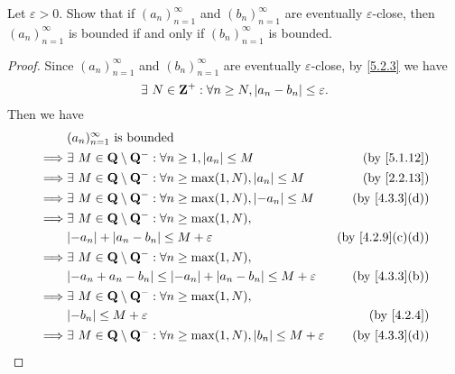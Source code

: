 \begin{exercise}\label{ex 5.2.2}
  Let \(\varepsilon > 0\).
  Show that if \((a_n)_{n = 1}^{\infty}\) and \((b_n)_{n = 1}^{\infty}\) are eventually \(\varepsilon\)-close, then \((a_n)_{n = 1}^{\infty}\) is bounded if and only if \((b_n)_{n = 1}^{\infty}\) is bounded.
\end{exercise}

\begin{proof}
  Since \((a_n)_{n = 1}^{\infty}\) and \((b_n)_{n = 1}^{\infty}\) are eventually \(\varepsilon\)-close, by \cref{5.2.3} we have
  \[
    \exists\ N \in \mathbf{Z}^+ : \forall n \geq N, \left\lvert a_n - b_n\right\rvert \leq \varepsilon.
  \]
  Then we have
  \begin{align*}
             & (a_n)_{n = 1}^\infty \text{ is bounded}                                                                                       \\
    \implies & \exists\ M \in \Q \setminus \Q^- : \forall n \geq 1, \abs{a_n} \leq M                        & \text{(by \cref{5.1.12})}      \\
    \implies & \exists\ M \in \Q \setminus \Q^- : \forall n \geq \max(1, N), \abs{a_n} \leq M               & \text{(by \cref{2.2.13})}      \\
    \implies & \exists\ M \in \Q \setminus \Q^- : \forall n \geq \max(1, N), \abs{-a_n} \leq M              & \text{(by \cref{4.3.3}(d))}    \\
    \implies & \exists\ M \in \Q \setminus \Q^- : \forall n \geq \max(1, N),                                                                 \\
             & \abs{-a_n} + \abs{a_n - b_n} \leq M + \varepsilon                                            & \text{(by \cref{4.2.9}(c)(d))} \\
    \implies & \exists\ M \in \Q \setminus \Q^- : \forall n \geq \max(1, N),                                                                 \\
             & \abs{-a_n + a_n - b_n} \leq \abs{-a_n} + \abs{a_n - b_n} \leq M + \varepsilon                & \text{(by \cref{4.3.3}(b))}    \\
    \implies & \exists\ M \in \Q \setminus \Q^- : \forall n \geq \max(1, N),                                                                 \\
             & \abs{-b_n} \leq M + \varepsilon                                                              & \text{(by \cref{4.2.4})}       \\
    \implies & \exists\ M \in \Q \setminus \Q^- : \forall n \geq \max(1, N), \abs{b_n} \leq M + \varepsilon & \text{(by \cref{4.3.3}(d))}    \\

\end{align*}
\end{proof}
